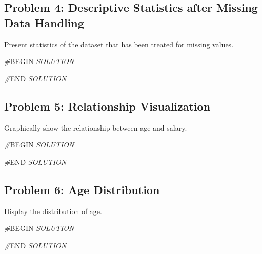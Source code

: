 \documentclass[
]{article}
\newenvironment{Shaded}{\begin{snugshade}}{\end{snugshade}}
\newcommand{\CommentTok}[1]{\textcolor[rgb]{0.56,0.35,0.01}{\textit{#1}}}
\newcommand{\RegionMarkerTok}[1]{#1}
\begin{document}
\hypertarget{problem-4-descriptive-statistics-after-missing-data-handling}{%
\subsection{Problem 4: Descriptive Statistics after Missing Data
Handling}\label{problem-4-descriptive-statistics-after-missing-data-handling}}

Present statistics of the dataset that has been treated for missing
values.

\begin{Shaded}
\begin{Highlighting}[]
\CommentTok{\#}\RegionMarkerTok{BEGIN}\CommentTok{ SOLUTION}

\CommentTok{\#}\RegionMarkerTok{END}\CommentTok{ SOLUTION}
\end{Highlighting}
\end{Shaded}

\hypertarget{problem-5-relationship-visualization}{%
\subsection{Problem 5: Relationship
Visualization}\label{problem-5-relationship-visualization}}

Graphically show the relationship between age and salary.

\begin{Shaded}
\begin{Highlighting}[]
\CommentTok{\#}\RegionMarkerTok{BEGIN}\CommentTok{ SOLUTION}

\CommentTok{\#}\RegionMarkerTok{END}\CommentTok{ SOLUTION}
\end{Highlighting}
\end{Shaded}

\hypertarget{problem-6-age-distribution}{%
\subsection{Problem 6: Age
Distribution}\label{problem-6-age-distribution}}

Display the distribution of age.

\begin{Shaded}
\begin{Highlighting}[]
\CommentTok{\#}\RegionMarkerTok{BEGIN}\CommentTok{ SOLUTION}

\CommentTok{\#}\RegionMarkerTok{END}\CommentTok{ SOLUTION}
\end{Highlighting}
\end{Shaded}
\end{document}
